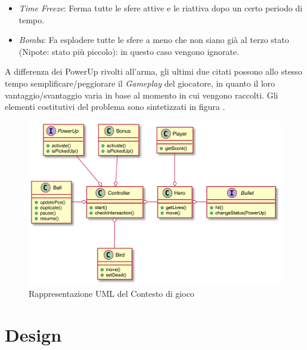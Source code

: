 \documentclass[a4paper,12pt]{report}
\begin{document}
\begin{itemize}
    \item \emph{Time Freeze}: Ferma tutte le sfere attive e le riattiva dopo un certo periodo di tempo.
    \item \emph{Bomba}: Fa esplodere tutte le sfere a meno che non siano già al terzo stato (Nipote: stato più piccolo): in questo caso vengono ignorate.
\end{itemize}
A differenza dei PowerUp rivolti all'arma, gli ultimi due citati possono allo stesso tempo semplificare/peggiorare il \emph{Gameplay} del giocatore, in quanto il loro vantaggio/svantaggio varia in base al momento in cui vengono raccolti.
Gli elementi costitutivi del problema sono sintetizzati in figura .

\begin{figure}[H]
\centering{}
\includegraphics[width=14cm]{img/AbstractUml.png}
\caption{Rappresentazione UML del Contesto di gioco}
\label{img:abstract}
\end{figure}

\chapter{Design}
\end{document}
